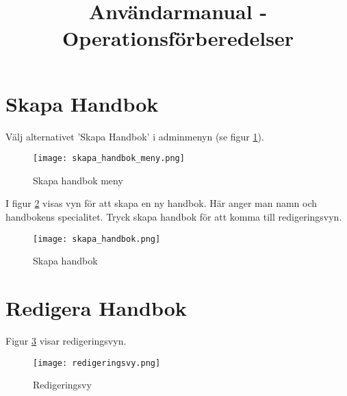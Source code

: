 \documentclass[12pt]{amsart}
\title{Användarmanual - Operationsförberedelser}
\date{} %
\begin{document}
\maketitle
\tableofcontents

\section{Skapa Handbok}
Välj alternativet 'Skapa Handbok' i adminmenyn (se figur \ref{fig:skapa_handbok_meny}).

\begin{figure}[H]
	\begin{center}
	\texttt{[image: skapa\_handbok\_meny.png]}
	\caption{Skapa handbok meny}
	\label{fig:skapa_handbok_meny}
	\end{center}
\end{figure}

I figur \ref{fig:skapa_handbok} visas vyn för att skapa en ny handbok. Här anger man namn och handbokens specialitet. Tryck skapa handbok för att komma till redigeringsvyn. 
 \begin{figure}[H]
	\begin{center}
	\texttt{[image: skapa\_handbok.png]}
	\caption{Skapa handbok}
	\label{fig:skapa_handbok}
	\end{center}
\end{figure}
 
 \section{Redigera Handbok}
Figur \ref{fig:redigeringsvy} visar redigeringsvyn.

  \begin{figure}[H]
	\begin{center}
	\texttt{[image: redigeringsvy.png]}
	\caption{Redigeringsvy}
	\label{fig:redigeringsvy}
	\end{center}
\end{figure}
\end{document}
